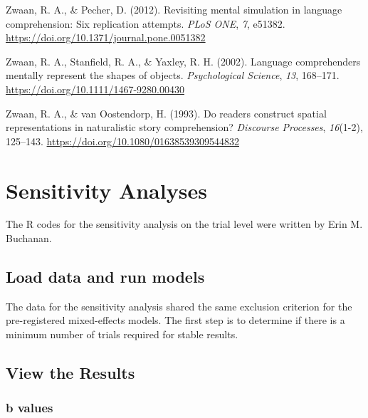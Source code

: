 \documentclass[
  man,floatsintext]{apa7}
\newlength{\cslhangindent}
\newlength{\cslentryspacingunit} %
\newenvironment{CSLReferences}[2] %
 {%
  \setlength{\parindent}{0pt}
  \ifodd #1
  \let\oldpar\par
  \def\par{\hangindent=\cslhangindent\oldpar}
  \fi
  \setlength{\parskip}{#2\cslentryspacingunit}
 }%
 {}
\begin{document}
\begin{CSLReferences}{1}{0}
\leavevmode{}%
Zwaan, R. A., \& Pecher, D. (2012). Revisiting mental simulation in language comprehension: Six replication attempts. \emph{PLoS ONE}, \emph{7}, e51382. \url{https://doi.org/10.1371/journal.pone.0051382}

\leavevmode{}%
Zwaan, R. A., Stanfield, R. A., \& Yaxley, R. H. (2002). Language comprehenders mentally represent the shapes of objects. \emph{Psychological Science}, \emph{13}, 168--171. \url{https://doi.org/10.1111/1467-9280.00430}

\leavevmode{}%
Zwaan, R. A., \& van Oostendorp, H. (1993). Do readers construct spatial representations in naturalistic story comprehension? \emph{Discourse Processes}, \emph{16}(1-2), 125--143. \url{https://doi.org/10.1080/01638539309544832}

\end{CSLReferences}

\newpage

\hypertarget{appendix-appendix}{%
\appendix}


\hypertarget{sensitivity-analyses}{%
\section{Sensitivity Analyses}\label{sensitivity-analyses}}

The R codes for the sensitivity analysis on the trial level were written by Erin M. Buchanan.

\hypertarget{load-data-and-run-models}{%
\subsection{Load data and run models}\label{load-data-and-run-models}}

The data for the sensitivity analysis shared the same exclusion criterion for the pre-registered mixed-effects models. The first step is to determine if there is a minimum number of trials required for stable results.

\hypertarget{view-the-results}{%
\subsection{View the Results}\label{view-the-results}}

\hypertarget{b-values}{%
\subsubsection{b values}\label{b-values}}
\end{document}
